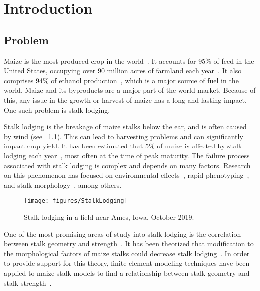 \chapter{Introduction}
\label{ch:intro}


\section{Problem}
\label{sec:problem}
Maize is the most produced crop in the world~. It accounts for 95\% of feed in the United States, occupying over 90 million acres of farmland each year~. It also comprises 94\% of ethanol production~, which is a major source of fuel in the world. Maize and its byproducts are a major part of the world market. Because of this, any issue in the growth or harvest of maize has a long and lasting impact. One such problem is stalk lodging.

Stalk lodging is the breakage of maize stalks below the ear, and is often caused by wind (see ~\cref{fig:StalkLodging}). This can lead to harvesting problems and can significantly impact crop yield. It has been estimated that 5\% of maize is affected by stalk lodging each year~, most often at the time of peak maturity. The failure process associated with stalk lodging is complex and depends on many factors. Research on this phenomenon has focused on environmental effects~, rapid phenotyping~, and stalk morphology~, among others. 

\begin{figure}[htbp]
	\centering
	\texttt{[image: figures/StalkLodging]}
	\caption[Stalk lodging in a field.]{Stalk lodging in a field near Ames, Iowa, October 2019.}
	\label{fig:StalkLodging}
\end{figure}

One of the most promising areas of study into stalk lodging is the correlation between stalk geometry and strength~. It has been theorized that modification to the morphological factors of maize stalks could decrease stalk lodging~. In order to provide support for this theory, finite element modeling techniques have been applied to maize stalk models to find a relationship between stalk geometry and stalk strength~.

